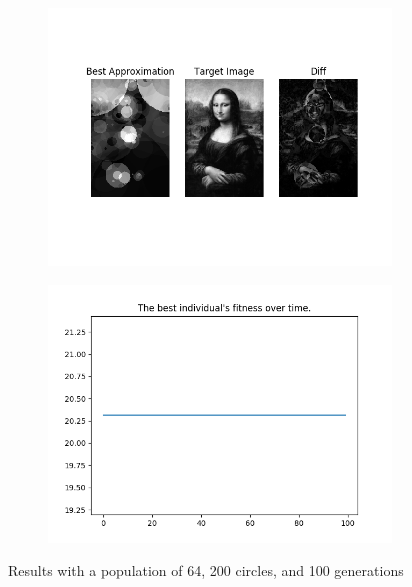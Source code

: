 \documentclass{article}
\begin{document}
\begin{figure}[H]
    \centering
    \begin{subfigure}[b]{0.45\textwidth}
        \centering
        \includegraphics[width=\textwidth]{output/ca-p64c200g100.png}
    \end{subfigure}
    \begin{subfigure}[b]{0.45\textwidth}
        \centering
        \includegraphics[width=\textwidth]{output/ca-p64c200g100-fitness.png}
    \end{subfigure}
    \caption{Results with a population of 64, 200 circles, and 100 generations}\label{fig:ca-p64-c200-g100}
\end{figure}
\end{document}
